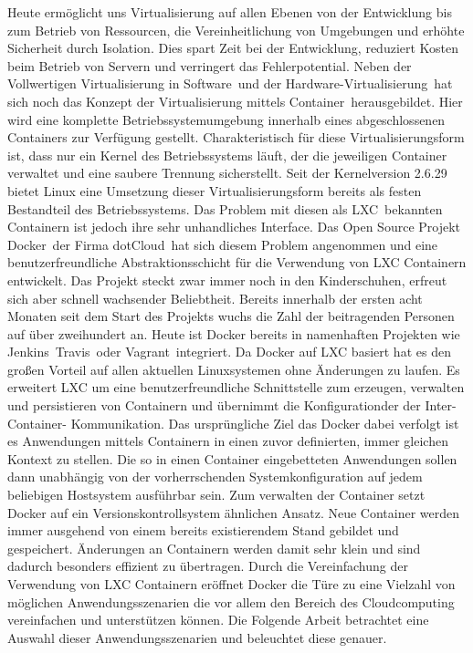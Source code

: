 Heute ermöglicht uns Virtualisierung auf \glqq allen Ebenen von der Entwicklung bis zum Betrieb von Ressourcen, die Vereinheitlichung von Umgebungen und erhöhte Sicherheit durch Isolation. Dies spart Zeit bei der Entwicklung, reduziert Kosten beim Betrieb von Servern und verringert das Fehlerpotential.\grqq \cite[S. 1]{schroder_container-virtualisierung_2014}
Neben der Vollwertigen \grq Virtualisierung in Software\grq\ und der \grq Hardware-Virtualisierung\grq\ hat sich noch das Konzept der \grq Virtualisierung mittels Container\grq\ herausgebildet.
\glqq Hier wird eine komplette Betriebssystemumgebung innerhalb eines abgeschlossenen Containers zur Verfügung gestellt. Charakteristisch für diese Virtualisierungsform ist, dass nur ein Kernel des Betriebssystems läuft, der die jeweiligen Container verwaltet und eine saubere Trennung sicherstellt.\grqq \cite{plotner_linux_2012}
Seit der Kernelversion 2.6.29 \cite{fischer_linux_2014} bietet Linux eine Umsetzung dieser Virtualisierungsform bereits als festen Bestandteil des Betriebssystems.
Das Problem mit diesen als \grq LXC\grq\ bekannten Containern ist jedoch ihre sehr unhandliches Interface.
Das Open Source Projekt \grq Docker\grq\ der Firma \grq dotCloud\grq\ hat sich diesem Problem angenommen und eine benutzerfreundliche Abstraktionsschicht für die Verwendung von LXC Containern entwickelt. Das Projekt steckt zwar immer noch in den Kinderschuhen, erfreut sich aber schnell wachsender Beliebtheit.
Bereits innerhalb der ersten acht Monaten seit dem Start des Projekts wuchs die Zahl der beitragenden Personen auf über zweihundert an. Heute ist Docker bereits in namenhaften Projekten wie \grq Jenkins\grq\, \grq Travis\grq\ oder \grq Vagrant\grq\ integriert. \cite{docker_docker_????}
Da Docker auf LXC basiert hat es den großen Vorteil auf allen aktuellen Linuxsystemen ohne Änderungen zu laufen. Es erweitert LXC um eine benutzerfreundliche Schnittstelle zum erzeugen, verwalten und persistieren von Containern und übernimmt die Konfigurationder der Inter-Container-
Kommunikation. Das ursprüngliche Ziel das Docker dabei verfolgt ist es Anwendungen mittels Containern in einen zuvor definierten, immer gleichen Kontext zu stellen. Die so in einen Container eingebetteten Anwendungen sollen dann unabhängig von der vorherrschenden Systemkonfiguration auf jedem beliebigen Hostsystem ausführbar sein.
Zum verwalten der Container setzt Docker auf ein Versionskontrollsystem ähnlichen Ansatz.
Neue Container werden immer ausgehend von einem bereits existierendem Stand gebildet und gespeichert. Änderungen an Containern werden damit sehr klein und sind dadurch besonders effizient zu übertragen.
Durch die Vereinfachung der Verwendung von LXC Containern eröffnet Docker die Türe zu eine Vielzahl von möglichen Anwendungsszenarien die vor allem den Bereich des Cloudcomputing vereinfachen und unterstützen können.
Die Folgende Arbeit betrachtet eine Auswahl dieser Anwendungsszenarien und beleuchtet diese genauer.